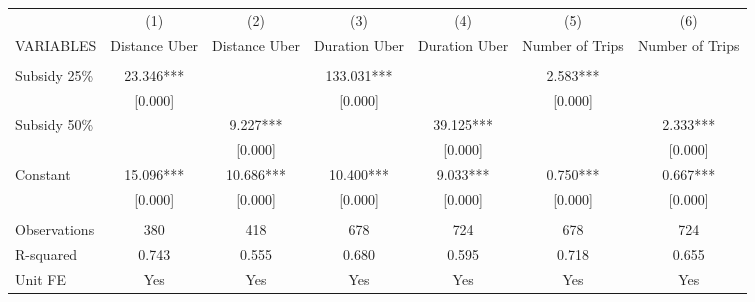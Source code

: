 \begin{tabular}{lcccccc} \hline
 & (1) & (2) & (3) & (4) & (5) & (6) \\
VARIABLES & Distance Uber & Distance Uber & Duration Uber & Duration Uber & Number of Trips & Number of Trips \\ \hline
 &  &  &  &  &  &  \\
Subsidy 25\% & 23.346*** &  & 133.031*** &  & 2.583*** &  \\
 & [0.000] &  & [0.000] &  & [0.000] &  \\
Subsidy 50\% &  & 9.227*** &  & 39.125*** &  & 2.333*** \\
 &  & [0.000] &  & [0.000] &  & [0.000] \\
Constant & 15.096*** & 10.686*** & 10.400*** & 9.033*** & 0.750*** & 0.667*** \\
 & [0.000] & [0.000] & [0.000] & [0.000] & [0.000] & [0.000] \\
 &  &  &  &  &  &  \\
Observations & 380 & 418 & 678 & 724 & 678 & 724 \\
R-squared & 0.743 & 0.555 & 0.680 & 0.595 & 0.718 & 0.655 \\
 Unit FE & Yes & Yes & Yes & Yes & Yes & Yes \\ \hline
\end{tabular}
